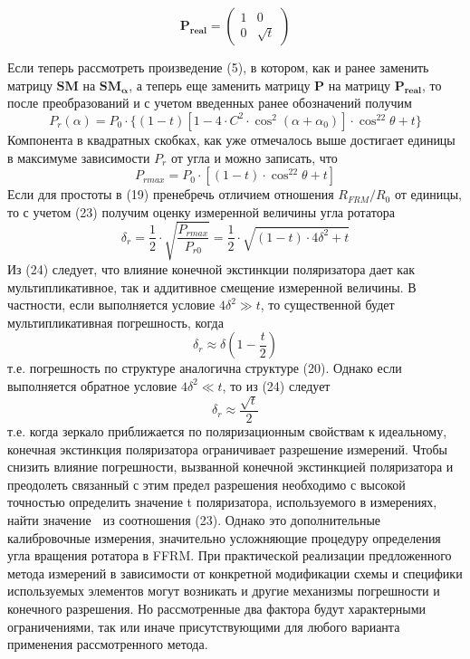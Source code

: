 \documentclass{article}
\begin{document}
\begin{equation}
	\bm{P_{real}} = 
	\begin{pmatrix}
		1 & 0 \\
		0 & \sqrt{t}
	\end{pmatrix}	
\end{equation}

Если теперь рассмотреть произведение (5), в котором, как и ранее заменить матрицу $\bm{SM}$ на $\bm{SM_\alpha}$, а теперь еще заменить матрицу $\bm{P}$ на матрицу $\bm{P_{real}}$, то после преобразований и с учетом введенных ранее обозначений получим
\begin{equation}
    P_r(\alpha)=P_0\cdot\{(1-t)\left[ 1-4\cdot C^2\cdot \cos^2(\alpha+\alpha_0) \right]\cdot \cos^22\theta+t \}
\end{equation}
Компонента в квадратных скобках, как уже отмечалось выше достигает единицы в максимуме зависимости $P_r$ от угла и можно записать, что 
\begin{equation}
    P_{rmax}=P_0\cdot\left[(1-t)\cdot \cos^22\theta+t \right]
\end{equation}
Если для простоты в (19) пренебречь отличием отношения $R_{FRM}/R_0 $ от единицы, то с учетом (23) получим оценку измеренной величины угла ротатора
\begin{equation}
    \delta_r=\frac{1}{2}\cdot\sqrt{\frac{P_{rmax}}{P_{r0}}}=\frac{1}{2}\cdot\sqrt{(1-t)\cdot4\delta^2+t}
\end{equation}
Из (24) следует, что влияние конечной экстинкции поляризатора дает как мультипликативное, так и аддитивное смещение измеренной величины. В частности, если выполняется условие $4\delta^2 \gg t$, то существенной будет мультипликативная погрешность, когда
\begin{equation}
    \delta_r\approx\delta\left(1-\frac{t}{2}\right)
\end{equation}
т.е. погрешность по структуре аналогична структуре (20). Однако если выполняется обратное условие $4\delta^2\ll t$, то из (24) следует
\begin{equation}
    \delta_r\approx\frac{\sqrt{t}}{2}
\end{equation}
т.е. когда зеркало приближается по поляризационным свойствам к идеальному, конечная экстинкция поляризатора ограничивает разрешение измерений.
Чтобы снизить влияние погрешности, вызванной конечной экстинкцией поляризатора и преодолеть связанный с этим предел разрешения необходимо с высокой точностью определить значение t поляризатора, используемого в измерениях, найти значение  из соотношения (23). Однако это дополнительные калибровочные измерения, значительно усложняющие процедуру определения угла вращения ротатора в FFRM.
При практической реализации предложенного метода измерений в зависимости от конкретной модификации схемы и специфики используемых элементов могут возникать и другие механизмы погрешности и конечного разрешения. Но рассмотренные два фактора будут характерными ограничениями, так или иначе присутствующими для любого варианта применения рассмотренного метода.   
\end{document}
